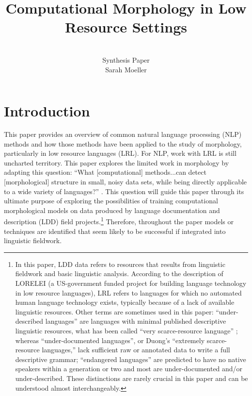 \documentclass[12pt]{article}
\title{Computational Morphology in Low Resource Settings}
\author{\\Synthesis Paper \\ Sarah Moeller}
\date{}
\begin{document}
\maketitle

\begin{singlespace}
\tableofcontents
\end{singlespace}

\pagebreak

\section{Introduction}
\label{sec:intro}

This paper provides an overview of common natural language processing (NLP) methods and how those methods have been applied to the study of morphology, particularly in low resource languages (LRL). For NLP, work with LRL is still uncharted territory. This paper explores the limited work in morphology by adapting this question: ``What [computational] methods...can detect [morphological] structure in small, noisy data sets, while being directly applicable to a wide variety of languages?'' \cite{bird_natural_2009}. This question will guide this paper through its ultimate purpose of exploring the possibilities of training computational morphological models on data produced by language documentation and description (LDD) field projects.\footnote{In this paper, LDD data refers to resources that results from linguistic fieldwork and basic linguistic analysis. According to the description of LORELEI (a US-government funded project for building language technology in low resource languages), LRL refers to languages for which no automated human language technology exists, typically because of a lack of available linguistic resources. Other terms are sometimes used in this paper: ``under-described languages'' are languages with minimal published descriptive linguistic resources, what has been called ``very scarce-resource language'' \cite{duong_natural_2017}; whereas ``under-documented languages'', or Duong's ``extremely scarce-resource languages,'' lack sufficient raw or annotated data to write a full descriptive grammar; ``endangered languages'' are predicted to have no native speakers within a generation or two and most are under-documented and/or under-described. These distinctions are rarely crucial in this paper and can be understood almost interchangeably.} Therefore, throughout the paper models or techniques are identified that seem likely to be successful if integrated into linguistic fieldwork.
\end{document}

